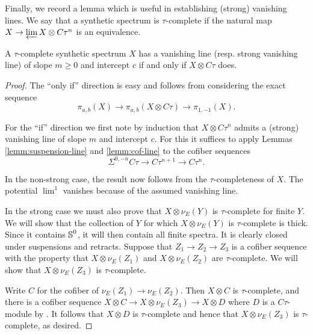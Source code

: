 Finally, we record a lemma which is useful in establishing (strong) vanishing lines. We say that a synthetic spectrum is $\tau$-complete if the natural map $X \to \varprojlim X \otimes C\tau^{n}$ is an equivalence.

\begin{lem} \label{lemm:vl-ctau}
	A $\tau$-complete synthetic spectrum $X$ has a vanishing line (resp. strong vanishing line) of slope $m \geq 0$ and intercept $c$ if and only if $X \otimes C\tau$ does.
\end{lem}

\begin{proof}
  The ``only if'' direction is easy and follows from considering the exact sequence
  $$ \pi_{a,b}(X) \to \pi_{a,b}(X \otimes C\tau) \to \pi_{1,-1}(X). $$

  For the ``if'' direction we first note by induction that $X \otimes C\tau^n$ admits a (strong) vanishing line of slope $m$ and intercept $c$. For this it suffices to apply Lemmas \ref{lemm:suspension-line} and \ref{lemm:cof-line} to the cofiber sequences
  $$ \Sigma^{0,-n} C\tau \to C\tau^{n+1} \to C\tau^n. $$

  In the non-strong case, the result now follows from the $\tau$-completeness of $X$. The potential $\lim^1$ vanishes because of the assumed vanishing line.
  


    In the strong case we must also prove that $ X \otimes \nu_E(Y) $ is $\tau$-complete for finite $Y$. We will show that the collection of $Y$ for which $X \otimes \nu_E (Y)$ is $\tau$-complete is thick. Since it contains $\operatorname{\mathbb{S}}^0$, it will then contain all finite spectra. It is clearly closed under suspensions and retracts. Suppose that $Z_1 \to Z_2 \to Z_3$ is a cofiber sequence with the property that $X \otimes \nu_E (Z_1)$ and $X \otimes \nu_E (Z_2)$ are $\tau$-complete. We will show that $X \otimes \nu_E (Z_3)$ is $\tau$-complete.

    Write $C$ for the cofiber of $\nu_E (Z_1) \to \nu_E (Z_2)$. Then $X \otimes C$ is $\tau$-complete, and there is a cofiber sequence $X \otimes C \to X \otimes \nu_E (Z_3) \to X \otimes D$ where $D$ is a $C\tau$-module by . It follows that $X \otimes D$ is $\tau$-complete and hence that $X \otimes \nu_E (Z_3)$ is $\tau$-complete, as desired.
\end{proof}


